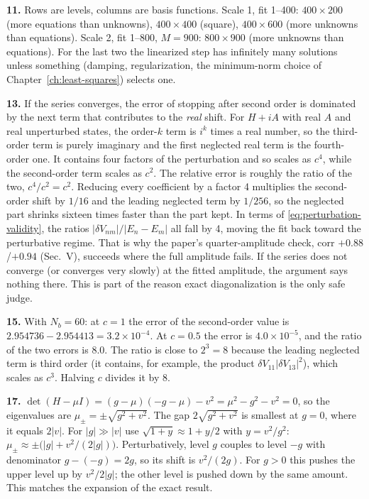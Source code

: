 \textbf{11.} Rows are levels, columns are basis functions. Scale 1, fit 1--400: $400\times200$ (more equations than unknowns), $400\times400$ (square), $400\times600$ (more unknowns than equations). Scale 2, fit 1--800, $M=900$: $800\times900$ (more unknowns than equations). For the last two the linearized step has infinitely many solutions unless something (damping, regularization, the minimum-norm choice of Chapter~\ref{ch:least-squares}) selects one.

\textbf{13.} If the series converges, the error of stopping after second order is dominated by the next term that contributes to the \emph{real} shift. For $H+iA$ with real $A$ and real unperturbed states, the order-$k$ term is $i^k$ times a real number, so the third-order term is purely imaginary and the first neglected real term is the fourth-order one. It contains four factors of the perturbation and so scales as $c^4$, while the second-order term scales as $c^2$. The relative error is roughly the ratio of the two, $c^4/c^2=c^2$. Reducing every coefficient by a factor 4 multiplies the second-order shift by $1/16$ and the leading neglected term by $1/256$, so the neglected part shrinks sixteen times faster than the part kept. In terms of \cref{eq:perturbation-validity}, the ratios $|\delta V_{nm}|/|E_n-E_m|$ all fall by 4, moving the fit back toward the perturbative regime. That is why the paper's quarter-amplitude check, corr $+0.88$/$+0.94$ (Sec.~V), succeeds where the full amplitude fails. If the series does not converge (or converges very slowly) at the fitted amplitude, the argument says nothing there. This is part of the reason exact diagonalization is the only safe judge.

\textbf{15.} With $N_b=60$: at $c=1$ the error of the second-order value is $2.954736-2.954413=3.2\times10^{-4}$. At $c=0.5$ the error is $4.0\times10^{-5}$, and the ratio of the two errors is $8.0$. The ratio is close to $2^3=8$ because the leading neglected term is third order (it contains, for example, the product $\delta V_{11}|\delta V_{13}|^2$), which scales as $c^3$. Halving $c$ divides it by 8.

\textbf{17.} $\det(H-\mu I)=(g-\mu)(-g-\mu)-v^2=\mu^2-g^2-v^2=0$, so the eigenvalues are $\mu_\pm=\pm\sqrt{g^2+v^2}$. The gap $2\sqrt{g^2+v^2}$ is smallest at $g=0$, where it equals $2|v|$. For $|g|\gg|v|$ use $\sqrt{1+y}\approx1+y/2$ with $y=v^2/g^2$: $\mu_\pm\approx\pm\bigl(|g|+v^2/(2|g|)\bigr)$. Perturbatively, level $g$ couples to level $-g$ with denominator $g-(-g)=2g$, so its shift is $v^2/(2g)$. For $g>0$ this pushes the upper level up by $v^2/2|g|$; the other level is pushed down by the same amount. This matches the expansion of the exact result.

